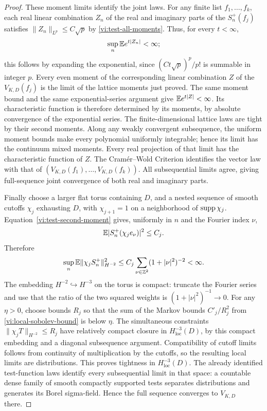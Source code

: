\begin{proof}
These moment limits identify the joint laws.
For any finite list $f_1,\ldots,f_k$, each real linear combination $Z_n$
of the real and imaginary parts of the $S_n^+(f_j)$ satisfies
$\|Z_n\|_{L^p}\leq C\sqrt p$ by \eqref{vi:test-all-moments}.
Thus, for every $t<\infty$,
\[
 \sup_n\mathbb E e^{t|Z_n|}<\infty;
\]
this follows by expanding the exponential, since
$(C t\sqrt p)^p/p!$ is summable in integer $p$.
Every even moment of the corresponding linear combination $Z$ of the
$V_{K,D}(f_j)$ is the limit of the lattice moments just proved.
The same moment bound and the same exponential-series argument give
$\mathbb E e^{t|Z|}<\infty$.
Its characteristic function is therefore determined by its moments, by
absolute convergence of the exponential series.  The finite-dimensional
lattice laws are tight by their second moments.  Along any weakly
convergent subsequence, the uniform moment bounds make every polynomial
uniformly integrable; hence its limit has the continuum mixed moments.
Every real projection of that limit has the characteristic function of
$Z$.  The Cram\'er--Wold Criterion identifies the vector law with that of
$(V_{K,D}(f_1),\ldots,V_{K,D}(f_k))$.
All subsequential limits agree, giving full-sequence joint convergence
of both real and imaginary parts.

Finally choose a larger flat torus containing $D$, and a nested sequence
of smooth cutoffs $\chi_j$ exhausting $D$, with $\chi_{j+1}=1$ on a
neighborhood of $\operatorname{supp}\chi_j$.
Equation~\eqref{vi:test-second-moment} gives, uniformly in $n$ and the
Fourier index $\nu$,
\[
 \mathbb E|S_n^+(\chi_j e_\nu)|^2\leq C_j.
\]
Therefore
\begin{equation}\label{vi:local-sobolev-bound}
 \sup_n\mathbb E\|\chi_j S_n^+\|_{H^{-2}}^2
 \leq C_j\sum_{\nu\in\mathbb Z^2}(1+|\nu|^2)^{-2}<\infty.
\end{equation}
The embedding $H^{-2}\hookrightarrow H^{-3}$ on the torus is compact:
truncate the Fourier series and use that the ratio of the two squared
weights is $(1+|\nu|^2)^{-1}\to0$.
For any $\eta>0$, choose bounds $R_j$ so that the sum of the Markov
bounds $C'_j/R_j^2$ from \eqref{vi:local-sobolev-bound} is below $\eta$.
The simultaneous constraints $\|\chi_j T\|_{H^{-2}}\leq R_j$ have
relatively compact closure in $H^{-3}_{\mathrm{loc}}(D)$, by this compact
embedding and a diagonal subsequence argument.
Compatibility of cutoff limits follows from continuity of multiplication
by the cutoffs, so the resulting local limits are distributions.
This proves tightness in $H^{-3}_{\mathrm{loc}}(D)$.
The already identified test-function laws identify every subsequential
limit in that space: a countable dense family of smooth compactly
supported tests separates distributions and generates its Borel
sigma-field.  Hence the full sequence converges to $V_{K,D}$ there.
\end{proof}

